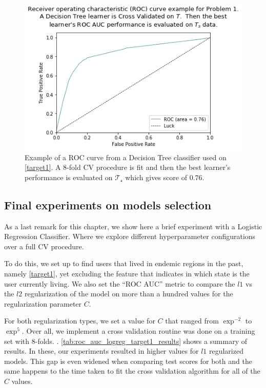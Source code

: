 \begin{figure}[h!]
\begin{center}
\includegraphics[width=1.2\columnwidth]{figures/figure-highROCAUC/figure-highROCAUC}
\caption{Example of a ROC curve from a Decision Tree classifier used on \cref{target1}. A 8-fold CV procedure is fit and then the best learner's performance is evaluated on $\mathcal{T_s}$ which gives score of $0.76$.}
\label{fg:highROCAUC}
\end{center}
\end{figure}


\subsection{Final experiments on models selection}\label{sub:final_model_selection}

As a last remark for this chapter, we show here a brief experiment with a Logistic Regression Classifier. Where we explore different hyperparameter configurations over a full CV procedure.

To do this, we set up to find users that lived in endemic regions in the past, namely \cref{target1}, yet excluding the feature that indicates in which state is the user currently living.
We also set the ``ROC AUC'' metric to compare the $l1$ vs the $l2$ regularization of the model on more than a hundred values for the regularization parameter $C$.

For both regularization types, we set a value for $C$ that ranged from $\exp^{-2}$ to $\exp^{5}$. Over all, we implement a cross validation routine was done on a training set with 8-folds.
.
\cref{tab:roc_auc_logreg_target1_results} shows a summary of results.
In these, our experiments resulted in higher values for $l1$ regularized models.
This gap is even widened when comparing test scores for both and the same happens to the time taken to fit the cross validation algorithm for all of the $C$ values.


